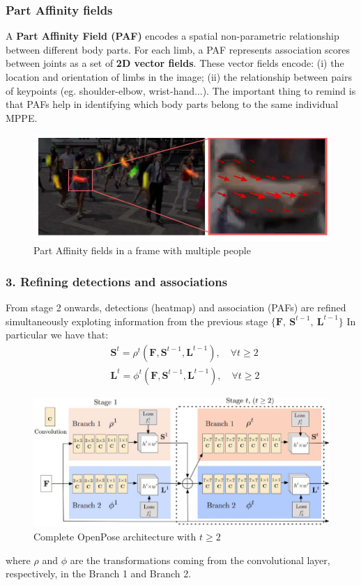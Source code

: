 \subsubsection*{\textsf{Part Affinity fields}}
A \textbf{Part Affinity Field (PAF)} encodes a spatial non-parametric relationship between different body parts. For each limb, a PAF represents association scores between joints as a set of \textbf{2D vector fields}. These vector fields encode: (i) the location and orientation of limbs in the image; (ii) the relationship between pairs of keypoints (eg. shoulder-elbow, wrist-hand...). The important thing to remind is that PAFs help in identifying which body parts belong to the same individual MPPE.

\begin{figure}[h]
    \centering
    \includegraphics[scale=0.8]{img/PAF.png}
    \caption{Part Affinity fields in a frame with multiple people}
\end{figure}

\subsubsection{3. Refining detections and associations}
From stage 2 onwards, detections (heatmap) and association (PAFs) are refined simultaneously exploting information from the previous stage
    $\{\mathbf{F},\ \mathbf{S}^{t-1}, \ \mathbf{L}^{t-1} \}$
In particular we have that: 
\begin{align}
    &\mathbf{S}^t = \rho^t(\mathbf{F},\mathbf{S}^{t-1}, \mathbf{L}^{t-1}), \quad \forall{t}\ge{2}\\
    &\mathbf{L}^t = \phi^t(\mathbf{F},\mathbf{S}^{t-1}, \mathbf{L}^{t-1}), \quad \forall{t}\ge{2}
\end{align}

\begin{figure}[h]
    \centering
    \includegraphics[scale=0.7]{img/OpenPose2.png}
    \caption{Complete OpenPose architecture with $t\ge{2}$}
\end{figure}
where $\rho$ and $\phi$ are the transformations coming from the convolutional layer, respectively, in the Branch 1 and Branch 2.


